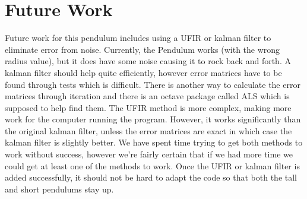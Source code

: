 \documentclass{article}
\begin{document}
\section{Future Work}
Future work for this pendulum includes using a UFIR or kalman filter to eliminate error from noise. Currently, the Pendulum works (with the wrong radius value), but it does have some noise causing it to rock back and forth. A kalman filter should help quite efficiently, however error matrices have to be found through tests which is difficult. There is another way to calculate the error matrices through iteration and there is an octave package called ALS which is supposed to help find them. The UFIR method is more complex, making more work for the computer running the program. However, it works significantly than the original kalman filter, unless the error matrices are exact in which case the kalman filter is slightly better. We have spent time trying to get both methods to work without success, however we're fairly certain that if we had more time we could get at least one of the methods to work. Once the UFIR or kalman filter is added successfully, it should not be hard to adapt the code so that both the tall and short pendulums stay up.
\end{document}
